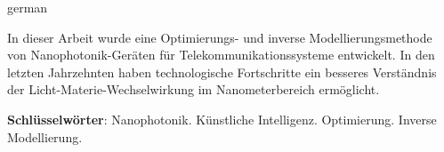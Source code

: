 

\begin{resumo}[Zusammenfassung]
\begin{otherlanguage*}{german}

In dieser Arbeit wurde eine Optimierungs- und inverse Modellierungsmethode von Nanophotonik-Geräten für Telekommunikationssysteme entwickelt. In den letzten Jahrzehnten haben technologische Fortschritte ein besseres Verständnis der Licht-Materie-Wechselwirkung im Nanometerbereich ermöglicht.







\vspace{\onelineskip}
\noindent
\textbf{Schlüsselwörter}: Nanophotonik. Künstliche Intelligenz. Optimierung. Inverse Modellierung.
\end{otherlanguage*}
\end{resumo}
